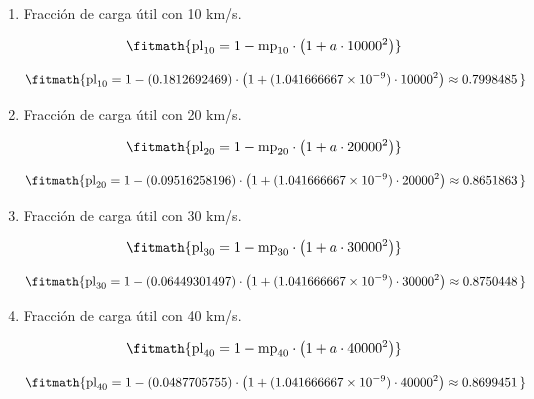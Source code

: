 \begin{enumerate}
\[\fitmath{\mathrm{po}_{40}=\mathrm{mp}_{40}\cdot a\cdot {40000}^{2}}\]

\[\fitmath{\mathrm{po}_{40}=(0.0487705755)\cdot (1.041666667\times10^{-9})\cdot {40000}^{2}\approx 0.08128429\,}\]

\item Fracción de carga útil con 10 km/s.

\[\fitmath{\mathrm{pl}_{10}=1-\mathrm{mp}_{10}\cdot \left(1+a\cdot {10000}^{2}\right)}\]

\[\fitmath{\mathrm{pl}_{10}=1-(0.1812692469)\cdot \left(1+(1.041666667\times10^{-9})\cdot {10000}^{2}\right)\approx 0.7998485\,}\]

\item Fracción de carga útil con 20 km/s.

\[\fitmath{\mathrm{pl}_{20}=1-\mathrm{mp}_{20}\cdot \left(1+a\cdot {20000}^{2}\right)}\]

\[\fitmath{\mathrm{pl}_{20}=1-(0.09516258196)\cdot \left(1+(1.041666667\times10^{-9})\cdot {20000}^{2}\right)\approx 0.8651863\,}\]

\item Fracción de carga útil con 30 km/s.

\[\fitmath{\mathrm{pl}_{30}=1-\mathrm{mp}_{30}\cdot \left(1+a\cdot {30000}^{2}\right)}\]

\[\fitmath{\mathrm{pl}_{30}=1-(0.06449301497)\cdot \left(1+(1.041666667\times10^{-9})\cdot {30000}^{2}\right)\approx 0.8750448\,}\]

\item Fracción de carga útil con 40 km/s.

\[\fitmath{\mathrm{pl}_{40}=1-\mathrm{mp}_{40}\cdot \left(1+a\cdot {40000}^{2}\right)}\]

\[\fitmath{\mathrm{pl}_{40}=1-(0.0487705755)\cdot \left(1+(1.041666667\times10^{-9})\cdot {40000}^{2}\right)\approx 0.8699451\,}\]

\end{enumerate}
